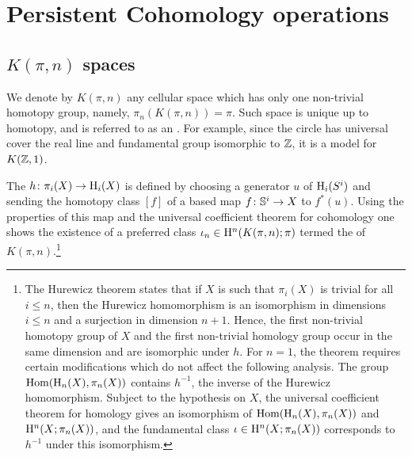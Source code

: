 
\section{Persistent Cohomology operations}\label{s:steenrod}



\subsection{$K(\pi, n)$ spaces}

We denote by $K(\pi, n)$ any cellular space which has only one non-trivial homotopy group, namely, $\pi_n(K(\pi, n)) = \pi$.
Such space is unique up to homotopy, and is referred to as an .
For example, since the circle has universal cover the real line and fundamental group isomorphic to $\mathbb{Z}$, it is a model for $K(\mathbb{Z},1)$.

The  $h \colon \pi_i(X) \to \mathrm{H}_i(X)$ is defined by choosing a generator $u$ of $\mathrm{H}_i(S^i)$ and sending the homotopy class $[f]$ of a based map $f \colon \mathbb{S}^i \to X$ to $f^*(u)$.
Using the properties of this map and the universal coefficient theorem for cohomology one shows the existence of a preferred class $\iota_n \in \mathrm{H}^n(K(\pi, n); \pi)$ termed the  of $K(\pi, n)$.\footnote{The Hurewicz theorem states that if $X$ is such that $\pi_i(X)$ is trivial for all $i \leq n$, then the Hurewicz homomorphism is an isomorphism in dimensions $i \leq n$ and a surjection in dimension $n+1$.
Hence, the first non-trivial homotopy group of $X$ and the first non-trivial homology group occur in the same dimension and are isomorphic under $h$.
For $n=1$, the theorem requires certain modifications which do not affect the following analysis.
The group $\mathrm{Hom}(\mathrm{H}_n(X), \pi_n(X))$ contains $h^{-1}$, the inverse of the Hurewicz homomorphism.
Subject to the hypothesis on $X$, the universal coefficient theorem for homology gives an isomorphism of $\mathrm{Hom}(\mathrm{H}_n(X), \pi_n(X))$ and $\mathrm{H}^n(X; \pi_n(X))$, and the fundamental class $\iota \in \mathrm{H}^n(X; \pi_n(X))$ corresponds to $h^{-1}$ under this isomorphism.}

